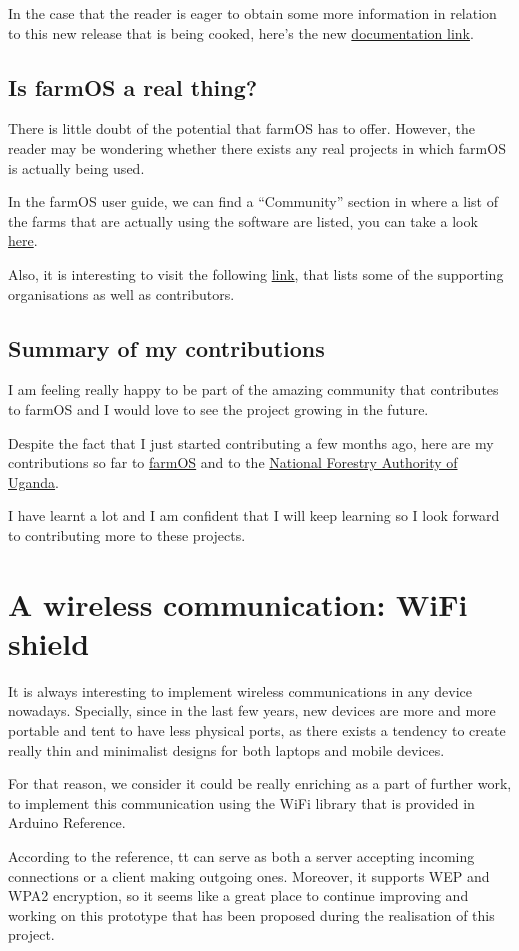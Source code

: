 In the case that the reader is eager to obtain some more information in relation to this new release that is being cooked, here's the new \href{https://docs.farmos.org/model/}{documentation link}.

\subsection{Is farmOS a real thing?}
There is little doubt of the potential that farmOS has to offer. However, the reader may be wondering whether there exists any real projects in which farmOS is actually being used.

In the farmOS user guide, we can find a ``Community'' section in where a list of the farms that are actually using the software are listed, you can take a look \href{https://farmos.org/community/farms/}{here}.

Also, it is interesting to visit the following \href{https://farmos.org/community/supporters/}{link}, that lists some of the supporting organisations as well as contributors.

\vspace{7mm}
\subsection{Summary of my contributions}
I am feeling really happy to be part of the amazing community that contributes to farmOS and I would love to see the project growing in the future.

Despite the fact that I just started contributing a few months ago, here are my contributions so far to \href{https://github.com/farmOS/farmOS/commits/7.x-1.x?author=beagaliana}{farmOS} and to the \href{https://github.com/mstenta/farm_nfa/commits/2.x?author=beagaliana}{National Forestry Authority of Uganda}\cite{nfa}.

I have learnt a lot and I am confident that I will keep learning so I look forward to contributing more to these projects.

\vspace{7mm}
\section{A wireless communication: WiFi shield}
It is always interesting to implement wireless communications in any device nowadays. Specially, since in the last few years, new devices are more and more portable and tent to have less physical ports, as there exists a tendency to create really thin and minimalist designs for both laptops and mobile devices.

For that reason, we consider it could be really enriching as a part of further work, to implement this communication using the WiFi library\cite{wifi} that is provided in Arduino Reference.

According to the reference, tt can serve as both a server accepting incoming connections or a client making outgoing ones. Moreover, it supports WEP and WPA2 encryption, so it seems like a great place to continue improving and working on this prototype that has been proposed during the realisation of this project.